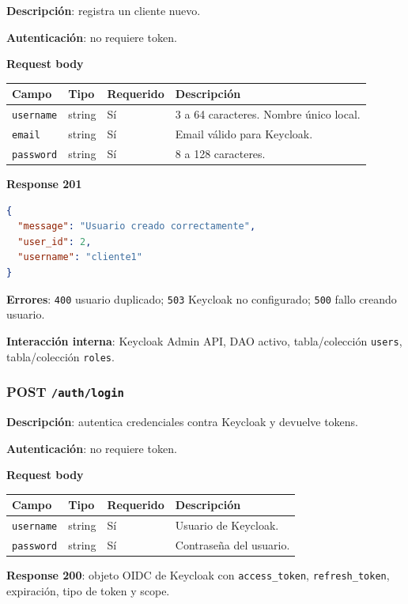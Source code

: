 \documentclass[12pt,letterpaper]{article}
\def\codefile#1{\nolinkurl{#1}}
\def\methodpost{\textbf{\color{green!45!black}POST}}
\begin{document}
\textbf{Descripción}: registra un cliente nuevo.

\textbf{Autenticación}: no requiere token.

\textbf{Request body}
\begin{longtable}{p{}p{}p{}p{}}
\toprule
\textbf{Campo} & \textbf{Tipo} & \textbf{Requerido} & \textbf{Descripción}\\
\midrule
\codefile{username} & string & Sí & 3 a 64 caracteres. Nombre único local.\\
\codefile{email} & string & Sí & Email válido para Keycloak.\\
\codefile{password} & string & Sí & 8 a 128 caracteres.\\
\bottomrule
\end{longtable}

\textbf{Response 201}
\begin{lstlisting}[language=json]
{
  "message": "Usuario creado correctamente",
  "user_id": 2,
  "username": "cliente1"
}
\end{lstlisting}

\textbf{Errores}: \codefile{400} usuario duplicado; \codefile{503} Keycloak no configurado; \codefile{500} fallo creando usuario.

\textbf{Interacción interna}: Keycloak Admin API, DAO activo, tabla/colección \codefile{users}, tabla/colección \codefile{roles}.

\subsubsection{\methodpost{} \codefile{/auth/login}}

\textbf{Descripción}: autentica credenciales contra Keycloak y devuelve tokens.

\textbf{Autenticación}: no requiere token.

\textbf{Request body}
\begin{longtable}{p{}p{}p{}p{}}
\toprule
\textbf{Campo} & \textbf{Tipo} & \textbf{Requerido} & \textbf{Descripción}\\
\midrule
\codefile{username} & string & Sí & Usuario de Keycloak.\\
\codefile{password} & string & Sí & Contraseña del usuario.\\
\bottomrule
\end{longtable}

\textbf{Response 200}: objeto OIDC de Keycloak con \codefile{access\_token}, \codefile{refresh\_token}, expiración, tipo de token y scope.
\end{document}
